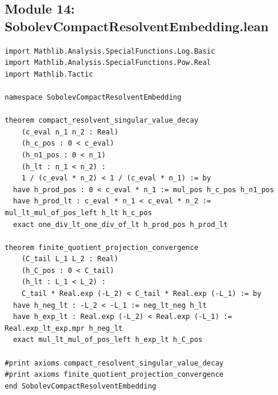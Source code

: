 \documentclass[11pt,a4paper]{article}
\begin{document}
\subsection{Module 14: SobolevCompactResolventEmbedding.lean}
\begin{lstlisting}[language=Lean4]
import Mathlib.Analysis.SpecialFunctions.Log.Basic
import Mathlib.Analysis.SpecialFunctions.Pow.Real
import Mathlib.Tactic

namespace SobolevCompactResolventEmbedding

theorem compact_resolvent_singular_value_decay
    (c_eval n_1 n_2 : Real)
    (h_c_pos : 0 < c_eval)
    (h_n1_pos : 0 < n_1)
    (h_lt : n_1 < n_2) :
    1 / (c_eval * n_2) < 1 / (c_eval * n_1) := by
  have h_prod_pos : 0 < c_eval * n_1 := mul_pos h_c_pos h_n1_pos
  have h_prod_lt : c_eval * n_1 < c_eval * n_2 := mul_lt_mul_of_pos_left h_lt h_c_pos
  exact one_div_lt_one_div_of_lt h_prod_pos h_prod_lt

theorem finite_quotient_projection_convergence
    (C_tail L_1 L_2 : Real)
    (h_C_pos : 0 < C_tail)
    (h_lt : L_1 < L_2) :
    C_tail * Real.exp (-L_2) < C_tail * Real.exp (-L_1) := by
  have h_neg_lt : -L_2 < -L_1 := neg_lt_neg h_lt
  have h_exp_lt : Real.exp (-L_2) < Real.exp (-L_1) := Real.exp_lt_exp.mpr h_neg_lt
  exact mul_lt_mul_of_pos_left h_exp_lt h_C_pos

#print axioms compact_resolvent_singular_value_decay
#print axioms finite_quotient_projection_convergence
end SobolevCompactResolventEmbedding
\end{lstlisting}
\end{document}
